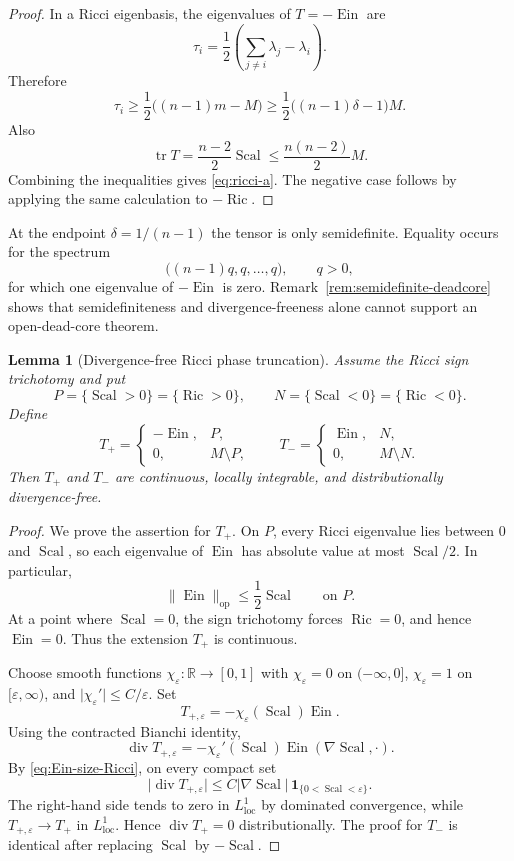 \documentclass[11pt,reqno]{amsart}
\newtheorem{lemma}[theorem]{Lemma}
\theoremstyle{definition}
\theoremstyle{remark}
\newcommand{\Ric}{\operatorname{Ric}}
\newcommand{\Scal}{\operatorname{Scal}}
\newcommand{\Ein}{\operatorname{Ein}}
\newcommand{\tr}{\operatorname{tr}}
\newcommand{\diver}{\operatorname{div}}
\newcommand{\R}{\mathbb R}
\newcommand{\abs}[1]{\lvert #1\rvert}
\newcommand{\norm}[1]{\lVert #1\rVert}
\newcommand{\eps}{\varepsilon}
\begin{document}
\begin{proof}
In a Ricci eigenbasis, the eigenvalues of $T=-\Ein$ are
\[
\tau_i=\frac12\left(\sum_{j\ne i}\lambda_j-\lambda_i\right).
\]
Therefore
\[
\tau_i\ge\frac12\bigl((n-1)m-M\bigr)
\ge\frac12\bigl((n-1)\delta-1\bigr)M.
\]
Also
\[
\tr T=\frac{n-2}{2}\Scal
\le\frac{n(n-2)}2M.
\]
Combining the inequalities gives \eqref{eq:ricci-a}.  The negative case follows by applying the same calculation to $-\Ric$.
\end{proof}

At the endpoint $\delta=1/(n-1)$ the tensor is only semidefinite.  Equality occurs for the spectrum
\begin{equation}\label{eq:critical-spectrum}
\bigl((n-1)q,q,\dots,q\bigr),
\qquad q>0,
\end{equation}
for which one eigenvalue of $-\Ein$ is zero.  Remark~\ref{rem:semidefinite-deadcore} shows that semidefiniteness and divergence-freeness alone cannot support an open-dead-core theorem.

\begin{lemma}[Divergence-free Ricci phase truncation]\label{lem:ricci-truncation}
Assume the Ricci sign trichotomy and put
\[
P=\{\Scal>0\}=\{\Ric>0\},
\qquad
N=\{\Scal<0\}=\{\Ric<0\}.
\]
Define
\[
T_+=\begin{cases}-\Ein,&P,\\0,&M\setminus P,\end{cases}
\qquad
T_-=\begin{cases}\Ein,&N,\\0,&M\setminus N.\end{cases}
\]
Then $T_+$ and $T_-$ are continuous, locally integrable, and distributionally divergence-free.
\end{lemma}

\begin{proof}
We prove the assertion for $T_+$.  On $P$, every Ricci eigenvalue lies between $0$ and $\Scal$, so each eigenvalue of $\Ein$ has absolute value at most $\Scal/2$.  In particular,
\begin{equation}\label{eq:Ein-size-Ricci}
\norm{\Ein}_{\mathrm{op}}\le\frac12\Scal
\qquad\text{on }P.
\end{equation}
At a point where $\Scal=0$, the sign trichotomy forces $\Ric=0$, and hence $\Ein=0$.  Thus the extension $T_+$ is continuous.

Choose smooth functions $\chi_\eps:\R\to[0,1]$ with $\chi_\eps=0$ on $(-\infty,0]$, $\chi_\eps=1$ on $[\eps,\infty)$, and $\abs{\chi_\eps'}\le C/\eps$.  Set
\[
T_{+,\eps}=-\chi_\eps(\Scal)\Ein.
\]
Using the contracted Bianchi identity,
\[
\diver T_{+,\eps}
=-\chi_\eps'(\Scal)\Ein(\nabla\Scal,\cdot).
\]
By \eqref{eq:Ein-size-Ricci}, on every compact set
\[
\abs{\diver T_{+,\eps}}
\le C\abs{\nabla\Scal}\,\mathbf1_{\{0<\Scal<\eps\}}.
\]
The right-hand side tends to zero in $L^1_{\mathrm{loc}}$ by dominated convergence, while $T_{+,\eps}\to T_+$ in $L^1_{\mathrm{loc}}$.  Hence $\diver T_+=0$ distributionally.  The proof for $T_-$ is identical after replacing $\Scal$ by $-\Scal$.
\end{proof}
\end{document}
